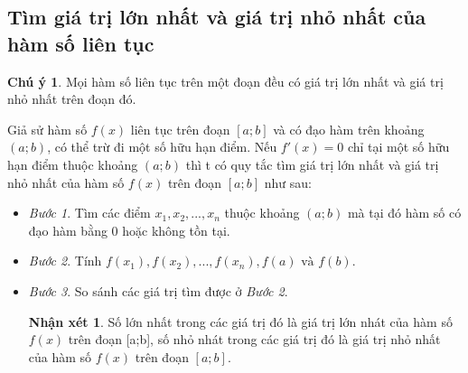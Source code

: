 \documentclass[12pt,a4paper,oneside]{book}
\theoremstyle{theorem}
\theoremstyle{definition}
\newtheorem{nx}[theorem2]{Nhận xét}
\newtheorem{cy}[theorem2]{Chú ý}
\begin{document}
    \subsection{Tìm giá trị lớn nhất và giá trị nhỏ nhất của hàm số liên tục}
        \begin{cy}
            Mọi hàm số liên tục trên một đoạn đều có giá trị lớn nhất và giá trị nhỏ nhất trên đoạn đó.
        \end{cy}
        Giả sử hàm số $f(x)$ liên tục trên đoạn $[a;b]$ và có đạo hàm trên khoảng $(a;b)$, có thể trừ đi một số hữu hạn điểm. Nếu $f'(x)=0$ chỉ tại một số hữu hạn điểm thuộc khoảng $(a;b)$ thì t có quy tắc tìm giá trị lớn nhất và giá trị nhỏ nhất của hàm số $f(x)$ trên đoạn $[a;b]$ như sau:
        \begin{itemize}
            \item[] \textit{Bước 1}. Tìm các điểm $x_1,x_2,...,x_n$ thuộc khoảng $(a;b)$ mà tại đó hàm số có đạo hàm bằng $0$ hoặc không tồn tại.
            \item[] \textit{Bước 2}. Tính $f(x_1),f(x_2),...,f(x_n),f(a) \text{ và } f(b)$.
            \item[] \textit{Bước 3}. So sánh các giá trị tìm được ở \textit{Bước 2}.
            \begin{nx}
                Số lớn nhất trong các giá trị đó là giá trị lớn nhát của hàm số $f(x)$ trên đoạn [a;b], số nhỏ nhát trong các giá trị đó là giá trị nhỏ nhất của hàm số $f(x)$ trên đoạn $[a;b]$.
            \end{nx}
        \end{itemize}
\end{document}
